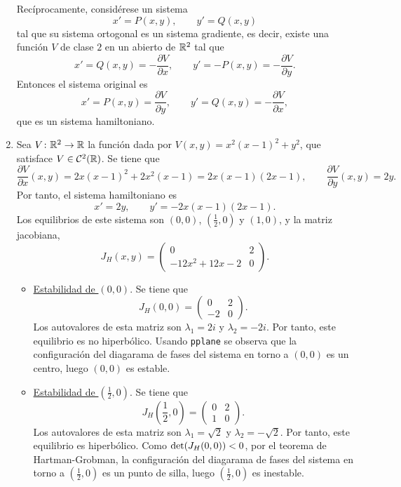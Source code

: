\documentclass[11pt]{report}
\begin{document}
\begin{solution}
\begin{enumerate}
        Recíprocamente, considérese un sistema
        \[x' = P(x,y), \qquad y' = Q(x,y)\]
        tal que su sistema ortogonal es un sistema gradiente, es decir, existe una función $V$ de clase $2$ en un abierto de $\mathbb R^2$ tal que
        \[x' = Q(x,y) = -\frac{\partial V}{\partial x}, \qquad y' = -P(x,y) = -\frac{\partial V}{\partial y}.\]
        Entonces el sistema original es
        \[x' = P(x,y) = \frac{\partial V}{\partial y}, \qquad y' = Q(x,y) = -\frac{\partial V}{\partial x},\]
        que es un sistema hamiltoniano.
        \item Sea $V \colon \mathbb R^2\to\mathbb R$ la función dada por $V(x,y) = x^2(x-1)^2+y^2$, que satisface $V\in\mathcal{C}^2(\mathbb R)$. Se tiene que
        \[\frac{\partial V}{\partial x}(x,y) = 2x(x-1)^2+2x^2(x-1) = 2x(x-1)(2x-1), \qquad \frac{\partial V}{\partial y}(x,y) =2y.\]
        Por tanto, el sistema hamiltoniano es
        \[x' = 2y, \qquad y' = -2x(x-1)(2x-1).\]
        Los equilibrios de este sistema son $(0,0)$, $(\frac{1}{2},0)$ y $(1,0)$, y la matriz jacobiana,
        \[J_H(x,y) = \left(\begin{array}{cc}
            0 & 2 \\
            -12x^2+12x-2 & 0
        \end{array}\right).\]
        \begin{itemize}
            \item \underline{Estabilidad de $(0,0)$}. Se tiene que
            \[J_H(0,0) = \left(\begin{array}{cc}
                0 & 2 \\
                -2 & 0
            \end{array}\right).\]
            Los autovalores de esta matriz son $\lambda_1 = 2i$ y $\lambda_2 = -2i$. Por tanto, este equilibrio es no hiperbólico. Usando \texttt{pplane} se observa que la configuración del diagarama de fases del sistema en torno a $(0,0)$ es un centro, luego $(0,0)$ es estable.
            \item \underline{Estabilidad de $(\frac{1}{2},0)$}. Se tiene que
            \[J_H(\frac{1}{2},0) = \left(\begin{array}{cc}
                0 & 2 \\
                1 & 0
            \end{array}\right).\]
            Los autovalores de esta matriz son $\lambda_1 = \sqrt{2}$ y $\lambda_2 = -\sqrt{2}$. Por tanto, este equilibrio es hiperbólico. Como $\textup{det}(J_H(0,0)) < 0$, por el teorema de Hartman-Grobman, la configuración del diagarama de fases del sistema en torno a $(\frac{1}{2},0)$ es un punto de silla, luego $(\frac{1}{2},0)$ es inestable.

\end{itemize}
\end{enumerate}
\end{solution}
\end{document}
